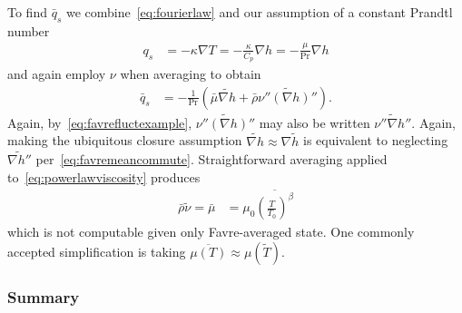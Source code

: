 \documentclass[letterpaper,11pt,nointlimits,reqno,draft]{amsart}
\newcommand{\Prandtl}[1][]{\ensuremath{\mbox{Pr}_{#1}}}
\begin{document}
To find $\bar{q}_s$ we combine~\eqref{eq:fourierlaw} and our assumption of a
constant Prandtl number
\begin{align}
  q_{s} &= - \kappa \nabla{} T
     = - \frac{\kappa}{C_p} \nabla{}h
     = - \frac{\mu}{\Prandtl} \nabla{}h
\end{align}
and again employ $\nu$ when averaging to obtain
\begin{align}
  \bar{q}_s
&= - \frac{1}{\Prandtl}\left(
                \bar{\mu}\widetilde{\nabla{}h}
              + \bar{\rho} \widetilde{\nu''\left(\nabla{}h\right)''}
            \right)
.
\end{align}
Again, by~\eqref{eq:favrefluctexample},
$\widetilde{\nu''\left(\nabla{}h\right)''}$ may also be written
$\widetilde{\nu''\nabla{}h''}$.  Again, making the ubiquitous closure
assumption $\widetilde{\nabla{}h}\approx\nabla\tilde{h}$ is equivalent to
neglecting $\widetilde{\nabla{}h''}$ per~\eqref{eq:favremeancommute}.
Straightforward averaging applied to~\eqref{eq:powerlawviscosity} produces
\begin{align}
   \bar{\rho}\tilde{\nu}
 = \bar{\mu}
&= \mu_0 \overline{\left(\frac{T}{T_0}\right)^\beta}
\end{align}
which is not computable given only Favre-averaged state.  One commonly accepted
simplification is taking $\overline{\mu\left(T\right)} \approx
\mu\left(\tilde{T}\right)$.

\subsubsection{Summary}
\end{document}
